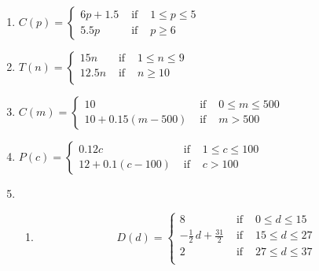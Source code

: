 \begin{enumerate}
\addtocounter{enumi}{2}

\item ${\displaystyle C(p) = \left\{ \begin{array}{rcl} 6p + 1.5 & \mbox{ if } & 1 \leq p \leq 5 \\
                                                            5.5p & \mbox{ if } & p\geq 6
                                     \end{array} \right. }$
                                     


\item  ${\displaystyle T(n) = \left\{ \begin{array}{rcl} 15n & \mbox{ if } & 1 \leq n \leq 9 \\
                                                            12.5n & \mbox{ if } & n \geq 10 \\ 
                                     \end{array} \right. }$
                                     

\item ${\displaystyle C(m) = \left\{ \begin{array}{rcl} 10 & \mbox{ if } & 0 \leq m \leq 500 \\
                                                            10+0.15(m-500) & \mbox{ if } & m > 500
                                     \end{array} \right. }$
                                     
\item ${\displaystyle P(c) = \left\{ \begin{array}{rcl} 0.12c & \mbox{ if } & 1 \leq c \leq 100 \\
                                                            12 + 0.1(c-100) & \mbox{ if } & c > 100 
                                     \end{array} \right. }$

\item 

\begin{enumerate}

\item \[{\displaystyle D(d) = \left\{ \begin{array}{rcl} 8 & \mbox{ if } & 0 \leq d \leq 15 \\
                                       -\frac{1}{2} \, d + \frac{31}{2} & \mbox{ if } & 15 \leq d \leq 27 \\
                                       2 & \mbox{ if } & 27 \leq d \leq 37  \\                      
                                     \end{array} \right. }\]


\end{enumerate}
\end{enumerate}
